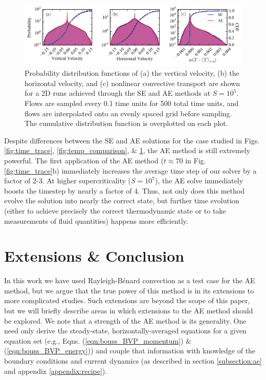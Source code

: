 \documentclass[aps, pre, onecolumn, nofootinbib, notitlepage, groupedaddress, amsfonts, amssymb, amsmath, longbibliography]{revtex4-1}
\newcommand{\RB}{Rayleigh-B\'{e}nard }
\begin{document}
\begin{figure}[b]
\includegraphics[width=\textwidth]{./figs/pdf_comparison.png}
\caption{Probability distribution functions of (a) the vertical velocity, (b) the horizontal velocity, and (c) nonlinear
convective transport are shown for a 2D runs achieved through the SE and AE methods
at $S = 10^{5}$.  Flows are sampled every 0.1 time units for 500 total time units,
and flows are interpolated onto an evenly spaced grid before sampling.
The cumulative distribution function is overplotted on each plot. 
\label{fig:pdf_comparison} }
\end{figure}


Despite differences between the SE and AE solutions for the case studied in 
Figs. \ref{fig:time_trace}, \ref{fig:temp_comparison}, \& \ref{fig:pdf_comparison},
the AE method is still extremely powerful.  The first application of the AE method
($t \approx 70$ in Fig. \ref{fig:time_trace}b) immediately increases the 
average time step of our solver by a factor of 2-3. At higher supercriticality
($S = 10^7$), the AE solve immediately boosts the timestep by nearly a factor of 4.
Thus, not only does this method evolve the solution into nearly the correct state, 
but further time evolution (either to achieve precisely the correct thermodynamic
state or to take measurements of fluid quantities) happens more efficiently.




\section{Extensions \& Conclusion}
\label{sec:extensions}
In this work we have used \RB convection as a test case for the AE method, but we argue that
the true power of this method is in its extensions to more complicated studies.
Such extensions are beyond the scope of this paper, but we will briefly describe
areas in which extensions to the AE method should be explored.
We note that a strength of the AE method is its generality.  One
need only derive the steady-state, horizontally-averaged equations for a given
equation set (e.g., Eqns. (\ref{eqn:bouss_BVP_momentum}) \& (\ref{eqn:bouss_BVP_energy}))
and couple that information with knowledge of the boundary conditions
and current dynamics (as described in
section \ref{subsection:ae} and appendix \ref{appendix:recipe}).
\end{document}
